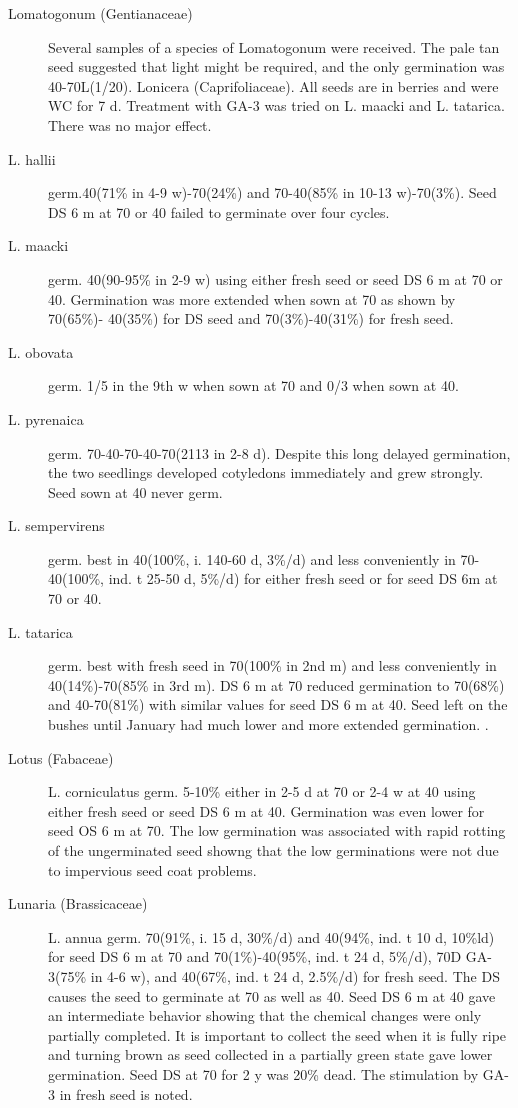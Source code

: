\begin{description}
\item[Lomatogonum (Gentianaceae)] Several samples of a species of
Lomatogonum were received. The pale tan seed suggested that light might be
required, and the only germination was 40-70L(1/20).
Lonicera (Caprifoliaceae). All seeds are in berries and were WC for 7 d.
Treatment with GA-3 was tried on L. maacki and L. tatarica. There was no major effect.
\item[L. hallii] germ.40(71\% in 4-9 w)-70(24\%) and 70-40(85\% in 10-13 w)-70(3\%).
Seed DS 6 m at 70 or 40 failed to germinate over four cycles.
\item[L. maacki] germ. 40(90-95\% in 2-9 w) using either fresh seed or seed DS 6 m at
70 or 40. Germination was more extended when sown at 70 as shown by 70(65\%)-
40(35\%) for DS seed and 70(3\%)-40(31\%) for fresh seed.
\item[L. obovata] germ. 1/5 in the 9th w when sown at 70 and 0/3 when sown at 40.
\item[L. pyrenaica] germ. 70-40-70-40-70(2113 in 2-8 d). Despite this long delayed
germination, the two seedlings developed cotyledons immediately and grew strongly.
Seed sown at 40 never germ.
\item[L. sempervirens] germ. best in 40(100\%, i. 140-60 d, 3\%/d) and less
conveniently in 70-40(100\%, ind. t 25-50 d, 5\%/d) for either fresh seed or for seed DS
6m at 70 or 40.
\item[L. tatarica] germ. best with fresh seed in 70(100\% in 2nd m) and less
conveniently in 40(14\%)-70(85\% in 3rd m). DS 6 m at 70 reduced germination to
70(68\%) and 40-70(81\%) with similar values for seed DS 6 m at 40. Seed left on the
bushes until January had much lower and more extended germination. .

\item[Lotus (Fabaceae)] L. corniculatus germ. 5-10\% either in 2-5 d at 70 or 2-4 w
at 40 using either fresh seed or seed DS 6 m at 40. Germination was even lower for
seed OS 6 m at 70. The low germination was associated with rapid rotting of the
ungerminated seed showng that the low germinations were not due to impervious
seed coat problems.
\item[Lunaria (Brassicaceae)] L. annua germ. 70(91\%, i. 15 d, 30\%/d) and
40(94\%, ind. t 10 d, 10\%ld) for seed DS 6 m at 70 and 70(1\%)-40(95\%, ind. t 24 d,
5\%/d), 70D GA-3(75\% in 4-6 w), and 40(67\%, ind. t 24 d, 2.5\%/d) for fresh seed. The
DS causes the seed to germinate at 70 as well as 40. Seed DS 6 m at 40 gave an
intermediate behavior showing that the chemical changes were only partially
completed. It is important to collect the seed when it is fully ripe and turning brown as
seed collected in a partially green state gave lower germination. Seed DS at 70 for
2 y was 20\% dead. The stimulation by GA-3 in fresh seed is noted.


\end{description}
